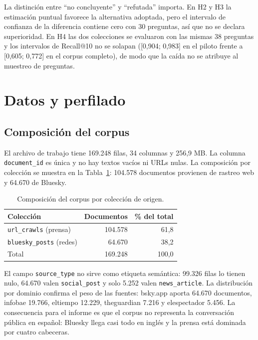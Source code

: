 \documentclass[11pt]{tg_usta}
\begin{document}
La distinción entre ``no concluyente'' y ``refutada'' importa. En H2 y H3 la estimación puntual favorece la alternativa adoptada, pero el intervalo de confianza de la diferencia contiene cero con 30 preguntas, así que no se declara superioridad. En H4 las dos colecciones se evaluaron con las mismas 38 preguntas y los intervalos de Recall@10 no se solapan ([0,904; 0,983] en el piloto frente a [0,605; 0,772] en el corpus completo), de modo que la caída no se atribuye al muestreo de preguntas.

\section{Datos y perfilado}

\subsection{Composición del corpus}

El archivo de trabajo tiene 169.248 filas, 34 columnas y 256,9 MB. La columna \texttt{document\_id} es única y no hay textos vacíos ni URLs nulas. La composición por colección se muestra en la Tabla~\ref{tab:composicion}: 104.578 documentos provienen de rastreo web y 64.670 de Bluesky.

\begin{table}[htbp]
\centering
\small
\begin{tabular}{lrr}
\toprule
Colección & Documentos & \% del total \\
\midrule
\texttt{url\_crawls} (prensa) & 104.578 & 61,8 \\
\texttt{bluesky\_posts} (redes) & 64.670 & 38,2 \\
\midrule
Total & 169.248 & 100,0 \\
\bottomrule
\end{tabular}
\caption{Composición del corpus por colección de origen.}
\label{tab:composicion}
\end{table}

El campo \texttt{source\_type} no sirve como etiqueta semántica: 99.326 filas lo tienen nulo, 64.670 valen \texttt{social\_post} y solo 5.252 valen \texttt{news\_article}. La distribución por dominio confirma el peso de las fuentes: bsky.app aporta 64.670 documentos, infobae 19.766, eltiempo 12.229, theguardian 7.216 y elespectador 5.456. La consecuencia para el informe es que el corpus no representa la conversación pública en español: Bluesky llega casi todo en inglés y la prensa está dominada por cuatro cabeceras.
\end{document}
